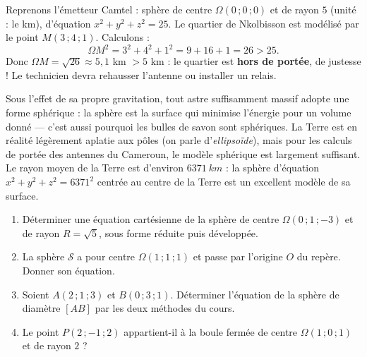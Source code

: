 \documentclass[11pt]{article}
\begin{document}
\begin{exemplebox}
Reprenons l'émetteur Camtel : sphère de centre $\Omega(0\,;0\,;0)$ et de rayon $5$ (unité : le km), d'équation $x^2+y^2+z^2=25$. Le quartier de Nkolbisson est modélisé par le point $M(3\,;4\,;1)$. Calculons :
\[ \Omega M^2 = 3^2+4^2+1^2 = 9+16+1 = 26 > 25. \]
Donc $\Omega M = \sqrt{26} \approx 5{,}1$ km $> 5$ km : le quartier est \textbf{hors de portée}, de justesse ! Le technicien devra rehausser l'antenne ou installer un relais.
\end{exemplebox}

\begin{savaistu}
Sous l'effet de sa propre gravitation, tout astre suffisamment massif adopte une forme sphérique : la sphère est la surface qui minimise l'énergie pour un volume donné — c'est aussi pourquoi les bulles de savon sont sphériques. La Terre est en réalité légèrement aplatie aux pôles (on parle d'\emph{ellipsoïde}), mais pour les calculs de portée des antennes du Cameroun, le modèle sphérique est largement suffisant. Le rayon moyen de la Terre est d'environ $\SI{6371}{km}$ : la sphère d'équation $x^2+y^2+z^2 = 6371^2$ centrée au centre de la Terre est un excellent modèle de sa surface.
\end{savaistu}

\begin{exercice}
\begin{enumerate}
  \item Déterminer une équation cartésienne de la sphère de centre $\Omega(0\,;1\,;-3)$ et de rayon $R=\sqrt{5}$, sous forme réduite puis développée.
  \item La sphère $\mathcal{S}$ a pour centre $\Omega(1\,;1\,;1)$ et passe par l'origine $O$ du repère. Donner son équation.
  \item Soient $A(2\,;1\,;3)$ et $B(0\,;3\,;1)$. Déterminer l'équation de la sphère de diamètre $[AB]$ par les deux méthodes du cours.
  \item Le point $P(2\,;-1\,;2)$ appartient-il à la boule fermée de centre $\Omega(1\,;0\,;1)$ et de rayon $2$ ?
\end{enumerate}
\end{exercice}
\end{document}
